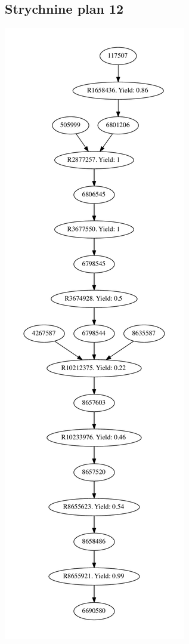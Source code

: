 \documentclass[a4paper,10pt,titlepage]{paper}
\begin{document}
\subsection{Strychnine plan 12}
\centering
\includegraphics[scale=0.4]{Synteseplaner/Strychnine/plan12.pdf}
\label{Appendix::Strychnine12}
\end{document}
